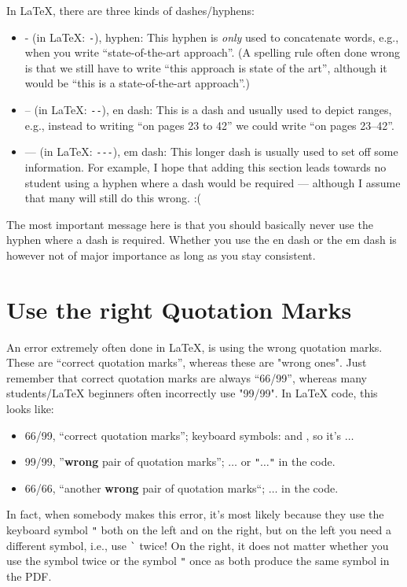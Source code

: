 In \LaTeX, there are three kinds of dashes/hyphens:
\begin{itemize}
  \item - (in \LaTeX: \verb!-!), hyphen: This hyphen is \emph{only} used to concatenate words, e.g., when you write ``state-of-the-art approach''. (A spelling rule often done wrong is that we still have to write ``this approach is state of the art'', although it would be ``this is a state-of-the-art approach''.)
  \item -- (in \LaTeX: \verb!--!), en dash: This is a dash and usually used to depict ranges, e.g., instead to writing ``on pages 23 to 42'' we could write ``on pages 23--42''.
  \item --- (in \LaTeX: \verb!---!), em dash: This longer dash is usually used to set off some information. For example, I hope that adding this section leads towards no student using a hyphen where a dash would be required --- although I assume that many will still do this wrong. :(
\end{itemize}

The most important message here is that you should basically never use the hyphen where a dash is required. Whether you use the en dash or the em dash is however not of major importance as long as you stay consistent.


\section{Use the right Quotation Marks}

An error extremely often done in \LaTeX{}, is using the wrong quotation marks. These are ``correct quotation marks'', whereas these are "wrong ones". Just remember that correct quotation marks are always ``66/99'', whereas many students/\LaTeX{} beginners often incorrectly use "99/99". In \LaTeX{} code, this looks like:
\begin{itemize}
  \item 66/99, ``correct quotation marks''; keyboard symbols: \textasciigrave and \textquotesingle, so it's \textasciigrave\textasciigrave$\dots$\textquotesingle\textquotesingle
  \item 99/99, ''\textbf{wrong} pair of quotation marks''; \textquotesingle\textquotesingle$\dots$\textquotesingle\textquotesingle{} or \verb!"!$\dots$\verb!"! in the code.
  \item 66/66, ``another \textbf{wrong} pair of quotation marks``; \textasciigrave\textasciigrave$\dots$\textasciigrave\textasciigrave{} in the code.
\end{itemize} 
In fact, when somebody makes this error, it's most likely because they use the keyboard symbol \verb!"! both on the left and on the right, but on the left you need a different symbol, i.e., use \verb!`! twice! On the right, it does not matter whether you use the symbol \textquotesingle{} twice or the symbol \verb!"! once as both produce the same symbol in the PDF.



